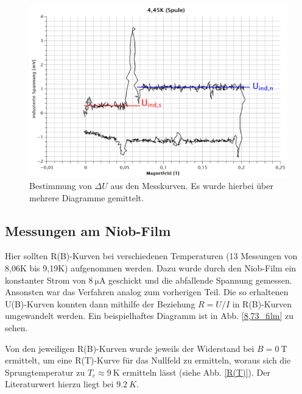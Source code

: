 \begin{figure}[H]
	\begin{center}
		\includegraphics[width=15cm]{delta_u.png}
		\caption{Bestimmung von $\Delta U$ aus den Messkurven. Es wurde hierbei über mehrere Diagramme gemittelt.}
		\label{delta_u}
	\end{center}
\end{figure}

\subsection{Messungen am Niob-Film}

Hier sollten R(B)-Kurven bei verschiedenen Temperaturen (13 Messungen von 8,06K bis 9,19K) aufgenommen werden. Dazu wurde durch den Niob-Film ein konstanter Strom von $\SI{8}{\micro\ampere}$ geschickt und die abfallende Spannung gemessen. Ansonsten war das Verfahren analog zum vorherigen Teil. Die so erhaltenen U(B)-Kurven konnten dann mithilfe der Beziehung $R=U/I$ in R(B)-Kurven umgewandelt werden. Ein beispielhaftes Diagramm ist in Abb. \ref{8,73_film} zu sehen.

Von den jeweiligen R(B)-Kurven wurde jeweils der Widerstand bei $B=\SI{0}{\tesla}$ ermittelt, um eine R(T)-Kurve für das Nullfeld zu ermitteln, woraus sich die Sprungtemperatur zu $T_{c}\approx\SI{9}{\kelvin}$ ermitteln lässt (siehe Abb. \ref{R(T)}). Der Literaturwert hierzu liegt bei $\SI{9,2}{K}$.

